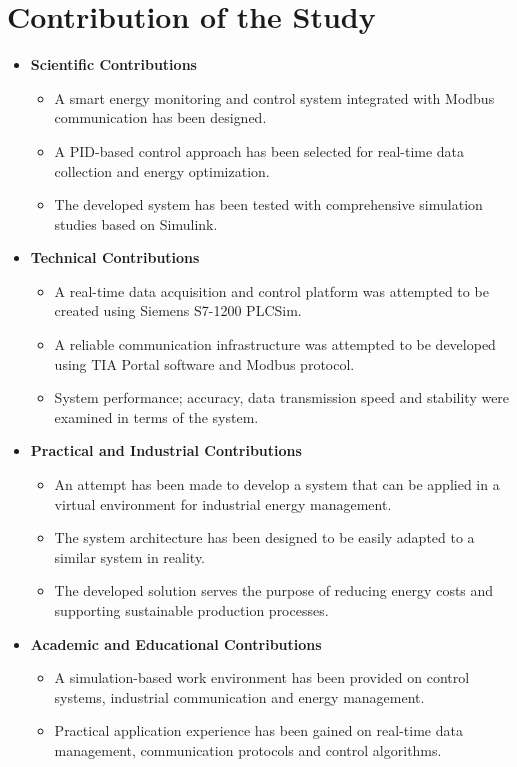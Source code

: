 \section{Contribution of the Study}
\begin{itemize}
    \item \textbf{Scientific Contributions}
    \begin{itemize}
        \item A smart energy monitoring and control system integrated with Modbus communication has been designed.
        \item A PID-based control approach has been selected for real-time data collection and energy optimization.
        \item The developed system has been tested with comprehensive simulation studies based on Simulink.
    \end{itemize}

    \item \textbf{Technical Contributions}
    \begin{itemize}
        \item A real-time data acquisition and control platform was attempted to be created using Siemens S7-1200 PLCSim.
        \item A reliable communication infrastructure was attempted to be developed using TIA Portal software and Modbus protocol.
        \item System performance; accuracy, data transmission speed and stability were examined in terms of the system.
    \end{itemize}

    \item \textbf{Practical and Industrial Contributions}
    \begin{itemize}
        \item An attempt has been made to develop a system that can be applied in a virtual environment for industrial energy management.
        \item The system architecture has been designed to be easily adapted to a similar system in reality.   
        \item The developed solution serves the purpose of reducing energy costs and supporting sustainable production processes.
    \end{itemize}

    \item \textbf{Academic and Educational Contributions}
    \begin{itemize}
        \item A simulation-based work environment has been provided on control systems, industrial communication and energy management.
        \item Practical application experience has been gained on real-time data management, communication protocols and control algorithms.
       

\end{itemize}
\end{itemize}
